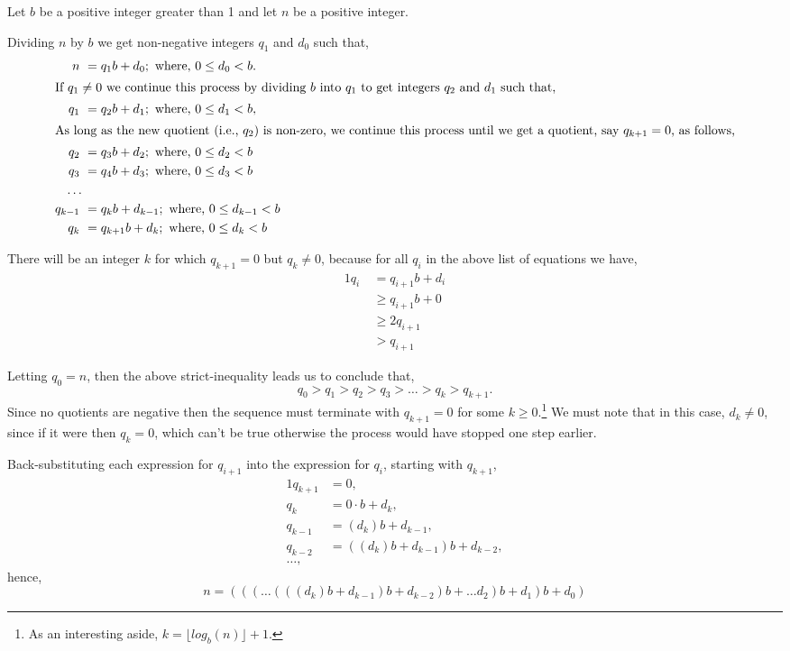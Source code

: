 \documentclass{article}
\begin{document}
Let \(b\) be a positive integer greater than 1 and
let \(n\) be a positive integer.

Dividing \(n\) by \(b\) we get non-negative integers \(q_1\) and \(d_0\) such that,
\begin{alignat*}{1}
n\ &= q_1b + d_0; \text{ where, } 0 \le{} d_0 < b.\\
\intertext{If \(q_1 \ne{} 0\) we continue this process by dividing \(b\) into \(q_1\) to get integers \(q_2\) and \(d_1\) such that,}
q_1\ &= q_2b + d_1; \text{ where, } 0 \le{} d_1 < b,\\
\intertext{As long as the new quotient (i.e., \(q_2\)) is non-zero, we continue this process
until we get a quotient, say \(q_{k+1} = 0\), as follows,}
q_2\ &= q_3b + d_2; \text{ where, } 0 \le{} d_2 < b\\
q_3\ &= q_4b + d_3; \text{ where, } 0 \le{} d_3 < b\\
\dots{}\\
q_{k-1}\ &= q_{k}b + d_{k-1}; \text{ where, } 0 \le{} d_{k-1} < b\\
q_{k}\ &= q_{k+1}b + d_k; \text{ where, } 0 \le{} d_k < b
\end{alignat*}

There will be an integer \(k\) for which \(q_{k+1} = 0\) but \(q_k \ne{} 0\), because for
all \(q_i\) in the above list of equations we have,
\begin{alignat*}{1}
q_i\  &= q_{i+1}b + d_i\\
\ &\ge{} q_{i+1}b + 0\\
\ &\ge{} 2q_{i+1}\\
\ &> q_{i+1}
\end{alignat*}

Letting \(q_0 = n\), then the above strict-inequality leads us to conclude that,
\[q_0 > q_1 > q_2 > q_3 > \dots{} > q_k > q_{k+1}.\]
Since no quotients are negative then the sequence
must terminate with \(q_{k+1} = 0\) for some \(k \ge{} 0\).\footnote{As an
interesting aside, \(k = {\lfloor}log_b(n){\rfloor} + 1\).} We must note that in
this case, \(d_k \ne{} 0\), since if it were then \(q_k = 0\), which can't be 
true otherwise the process would have stopped one step earlier.

\break
Back-substituting each expression for \(q_{i+1}\) into the expression for \(q_i\),
starting with \(q_{k+1}\),
\begin{alignat*}{1}
q_{k+1} &= 0,\\
q_k &= 0\cdot{}b + d_k,\\
q_{k-1} &= (d_k)b + d_{k-1},\\
q_{k-2} &= ((d_k)b + d_{k-1})b + d_{k-2},\\
\dots{},
\end{alignat*}
hence,
\[n = (((\dots{}(((d_k)b + d_{k-1})b + d_{k-2})b + \dots{} d_{2})b + d_{1})b + d_0)\]
\end{document}
